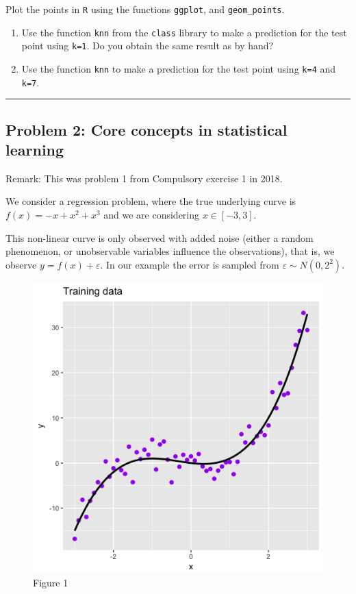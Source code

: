 \documentclass[]{article}
\providecommand{\tightlist}{%
  \setlength{\itemsep}{0pt}\setlength{\parskip}{0pt}}
\begin{document}
Plot the points in \texttt{R} using the functions \texttt{ggplot}, and
\texttt{geom\_points}.

\begin{enumerate}
\def\labelenumi{\alph{enumi}.}
\setcounter{enumi}{5}
\tightlist
\item
  Use the function \texttt{knn} from the \texttt{class} library to make
  a prediction for the test point using \texttt{k=1}. Do you obtain the
  same result as by hand?
\item
  Use the function \texttt{knn} to make a prediction for the test point
  using \texttt{k=4} and \texttt{k=7}.
\end{enumerate}

\begin{center}\rule{0.5\linewidth}{\linethickness}\end{center}

\hypertarget{problem-2-core-concepts-in-statistical-learning}{%
\subsection{Problem 2: Core concepts in statistical
learning}\label{problem-2-core-concepts-in-statistical-learning}}

Remark: This was problem 1 from Compulsory exercise 1 in 2018.

We consider a regression problem, where the true underlying curve is
\(f(x)=-x+x^2+x^3\) and we are considering \(x \in [-3,3]\).

This non-linear curve is only observed with added noise (either a random
phenomenon, or unobservable variables influence the observations), that
is, we observe \(y=f(x)+\varepsilon\). In our example the error is
sampled from \(\varepsilon\sim N(0,2^2)\).

\begin{figure}
\centering
\includegraphics{Prob1f1.png}
\caption{Figure 1}
\end{figure}
\end{document}
